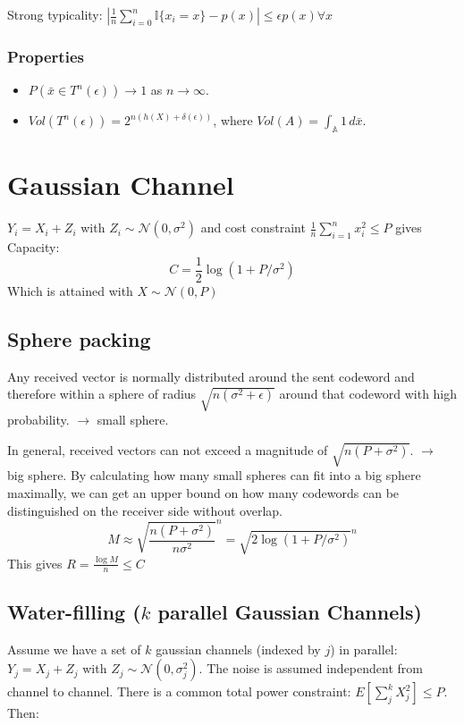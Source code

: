 \documentclass[10pt,a4paper,landscape]{article}
\begin{document}
\begin{multicols*}{4}
Strong typicality: $|\frac{1}{n} \sum_{i=0}^n \mathbb{I}\{x_i = x\} - p(x)| \leq \epsilon p(x) \forall x$

\subsubsection{Properties}
\begin{itemize}
 \item $P\left(\bar{x} \in T^n(\epsilon)\right) \rightarrow 1$ as $n \rightarrow \infty$.
 \item $Vol(T^n(\epsilon)) = 2^{n(h(X)+\delta(\epsilon))}$, where $Vol(A) = \int_\mathbb{A} 1\, d\bar{x}$.
\end{itemize}

\section{Gaussian Channel}
$Y_i = X_i + Z_i$ with $Z_i \sim \mathcal{N}(0, \sigma^2)$ and cost constraint $\frac{1}{n}\sum_{i=1}^{n} x_i^2 \leq P$ gives Capacity:
$$C = \frac{1}{2} \log(1 + P/\sigma^2)$$
Which is attained with $X \sim \mathcal{N}(0, P)$

\subsection{Sphere packing}
Any received vector is normally distributed around the sent codeword and therefore within a sphere of radius $\sqrt{n (\sigma^2 + \epsilon)}$  around that codeword with high probability. $\rightarrow$ small sphere.

In general, received vectors can not exceed a magnitude of $\sqrt{n(P + \sigma^2)}$. $\rightarrow$ big sphere. By calculating how many small spheres can fit into a big sphere maximally, we can get an upper bound on how many codewords can be distinguished on the receiver side without overlap.
$$ M \approx \sqrt{\frac{n(P + \sigma^2)}{n \sigma^2}}^n = \sqrt{2 \log (1 + P/\sigma^2)}^n$$
This gives $R = \frac{\log M}{n} \leq C$


\subsection{Water-filling ($k$ parallel Gaussian Channels)}
Assume we have a set of $k$ gaussian channels (indexed by $j$) in parallel: $Y_j = X_j + Z_j$ with $Z_j \sim \mathcal{N}(0, \sigma^2_j)$. The noise is assumed independent from channel to channel. There is a common total power constraint: $E[\sum_j^k X_j^2] \leq P$. Then:


\end{multicols*}
\end{document}
